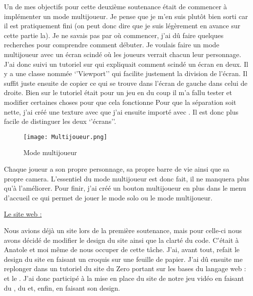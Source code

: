 \documentclass{article}
\begin{document}
\par
Un de mes objectifs pour cette deuxième soutenance était de commencer à implémenter un mode multijoueur. Je pense que je m’en suis plutôt bien sorti car il est pratiquement fini (on peut donc dire que je suis légèrement en avance sur cette partie la). Je ne savais pas par où commencer, j’ai dû faire quelques recherches pour comprendre comment débuter. Je voulais faire un mode multijoueur avec un écran scindé où les joueurs verrait chacun leur personnage. J’ai donc suivi un tutoriel sur  qui expliquait comment scindé un écran en deux. Il y a une classe nommée ‘’Viewport’’ qui facilite justement la division de l’écran. Il suffit juste ensuite de copier ce qui se trouve dans l’écran de gauche dans celui de droite. Bien sur le tutoriel était pour un jeu en  du coup il m’a fallu tester et modifier certaines choses pour que cela fonctionne
\newline
Pour que la séparation soit nette, j’ai créé une texture avec  que j’ai ensuite importé avec . Il est donc plus facile de distinguer les deux ‘’écrans’’. 
\newpage
\begin{figure}[h]
\begin{center}
\texttt{[image: Multijoueur.png]}
\caption{Mode multijoueur}
\end{center}
\end{figure}

\par
Chaque joueur a son propre personnage, sa propre barre de vie ainsi que sa propre camera. L’essentiel du mode multijoueur est donc fait, il ne manquera plus qu’à l’améliorer. Pour finir, j’ai créé un bouton multijoueur en plus dans le menu d’accueil ce qui permet de jouer le mode solo ou le mode multijoueur.
\newline

\underline{Le site web :}
\newline

\par
Nous avions déjà un site lors de la première soutenance, mais pour celle-ci nous avons décidé de modifier le design du site ainsi que la clarté du code. C'était à Anatole et moi même de nous occuper de cette tâche. J'ai, avant tout, refait le design du site en faisant un croquis sur une feuille de papier. J'ai dû  ensuite me replonger dans un tutoriel du site du Zero portant sur les bases du langage web :  et le . J'ai donc participé à la mise en place du site de notre jeu vidéo en faisant du , du  et, enfin, en faisant son design.
\newline
\end{document}
